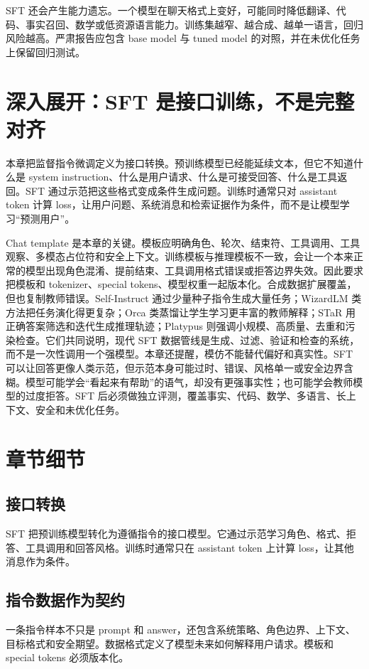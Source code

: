 \documentclass[UTF8,zihao=-4,openany]{ctexbook}
\begin{document}
SFT 还会产生能力遗忘。一个模型在聊天格式上变好，可能同时降低翻译、代码、事实召回、数学或低资源语言能力。训练集越窄、越合成、越单一语言，回归风险越高。严肃报告应包含 base model 与 tuned model 的对照，并在未优化任务上保留回归测试。

\section{深入展开：SFT 是接口训练，不是完整对齐}
本章把监督指令微调定义为接口转换。预训练模型已经能延续文本，但它不知道什么是 system instruction、什么是用户请求、什么是可接受回答、什么是工具返回。SFT 通过示范把这些格式变成条件生成问题。训练时通常只对 assistant token 计算 loss，让用户问题、系统消息和检索证据作为条件，而不是让模型学习“预测用户”。

Chat template 是本章的关键。模板应明确角色、轮次、结束符、工具调用、工具观察、多模态占位符和安全上下文。训练模板与推理模板不一致，会让一个本来正常的模型出现角色混淆、提前结束、工具调用格式错误或拒答边界失效。因此要求把模板和 tokenizer、special tokens、模型权重一起版本化。合成数据扩展覆盖，但也复制教师错误。Self-Instruct 通过少量种子指令生成大量任务；WizardLM 类方法把任务演化得更复杂；Orca 类蒸馏让学生学习更丰富的教师解释；STaR 用正确答案筛选和迭代生成推理轨迹；Platypus 则强调小规模、高质量、去重和污染检查。它们共同说明，现代 SFT 数据管线是生成、过滤、验证和检查的系统，而不是一次性调用一个强模型。本章还提醒，模仿不能替代偏好和真实性。SFT 可以让回答更像人类示范，但示范本身可能过时、错误、风格单一或安全边界含糊。模型可能学会“看起来有帮助”的语气，却没有更强事实性；也可能学会教师模型的过度拒答。SFT 后必须做独立评测，覆盖事实、代码、数学、多语言、长上下文、安全和未优化任务。

\section{章节细节}
\subsection{接口转换}
SFT 把预训练模型转化为遵循指令的接口模型。它通过示范学习角色、格式、拒答、工具调用和回答风格。训练时通常只在 assistant token 上计算 loss，让其他消息作为条件。

\subsection{指令数据作为契约}
一条指令样本不只是 prompt 和 answer，还包含系统策略、角色边界、上下文、目标格式和安全期望。数据格式定义了模型未来如何解释用户请求。模板和 special tokens 必须版本化。
\end{document}
